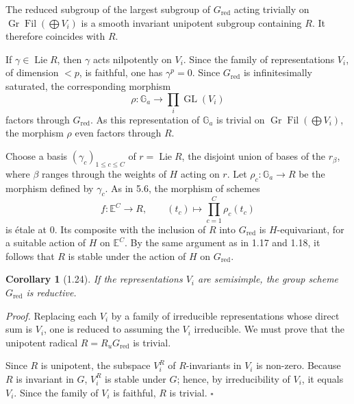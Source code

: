 \documentclass[10pt]{article}
\newcommand{\Ga}{\mathbb G_a}
\newcommand{\GL}{\operatorname{GL}}
\newcommand{\Lie}{\operatorname{Lie}}
\newcommand{\red}{\mathrm{red}}
\newcommand{\Fil}{\operatorname{Fil}}
\newcommand{\Gr}{\operatorname{Gr}}
\newcommand{\E}{\mathbb E}
\theoremstyle{deligne}
\newtheorem*{corollary*}{Corollary}
\newenvironment{proofdel}{\textit{Proof.}}{\hfill$\square$}
\begin{document}
The reduced subgroup of the largest subgroup of \(G_{\red}\) acting trivially on \(\Gr\Fil(\bigoplus V_i)\) is a smooth invariant unipotent subgroup containing \(R\). It therefore coincides with \(R\).

If \(\gamma\in\Lie R\), then \(\gamma\) acts nilpotently on \(V_i\). Since the family of representations \(V_i\), of dimension \(<p\), is faithful, one has \(\gamma^p=0\). Since \(G_{\red}\) is infinitesimally saturated, the corresponding morphism
\[
\rho:\Ga\longrightarrow\prod_i \GL(V_i)
\]
factors through \(G_{\red}\). As this representation of \(\Ga\) is trivial on \(\Gr\Fil(\bigoplus V_i)\), the morphism \(\rho\) even factors through \(R\).

Choose a basis \((\gamma_c)_{1\le c\le C}\) of \(r=\Lie R\), the disjoint union of bases of the \(r_\beta\), where \(\beta\) ranges through the weights of \(H\) acting on \(r\). Let \(\rho_c:\Ga\to R\) be the morphism defined by \(\gamma_c\). As in 5.6, the morphism of schemes
\[
f:\E^C\longrightarrow R,\qquad (t_c)\longmapsto \prod_{c=1}^{C}\rho_c(t_c)
\]
is étale at \(0\). Its composite with the inclusion of \(R\) into \(G_{\red}\) is \(H\)-equivariant, for a suitable action of \(H\) on \(\E^C\). By the same argument as in 1.17 and 1.18, it follows that \(R\) is stable under the action of \(H\) on \(G_{\red}\).

\begin{corollary*}[1.24]
If the representations \(V_i\) are semisimple, the group scheme \(G_{\red}\) is reductive.
\end{corollary*}

\begin{proofdel}
Replacing each \(V_i\) by a family of irreducible representations whose direct sum is \(V_i\), one is reduced to assuming the \(V_i\) irreducible. We must prove that the unipotent radical \(R=R_uG_{\red}\) is trivial.

Since \(R\) is unipotent, the subspace \(V_i^R\) of \(R\)-invariants in \(V_i\) is non-zero. Because \(R\) is invariant in \(G\), \(V_i^R\) is stable under \(G\); hence, by irreducibility of \(V_i\), it equals \(V_i\). Since the family of \(V_i\) is faithful, \(R\) is trivial.
\end{proofdel}
\end{document}
